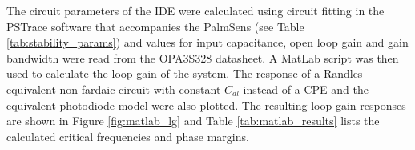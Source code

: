 
The circuit parameters of the IDE were calculated using circuit fitting in the PSTrace software that accompanies the PalmSens (see Table \ref{tab:stability_params}) and values for input capacitance, open loop gain and gain bandwidth were read from the OPA3S328 datasheet. A MatLab script was then used to calculate the loop gain of the system.  The response of a Randles equivalent non-fardaic circuit with constant $C_{dl}$ instead of a CPE and the equivalent photodiode model were also plotted. The resulting loop-gain responses are shown in Figure \ref{fig:matlab_lg} and Table \ref{tab:matlab_results} lists the calculated critical frequencies and phase margins.

